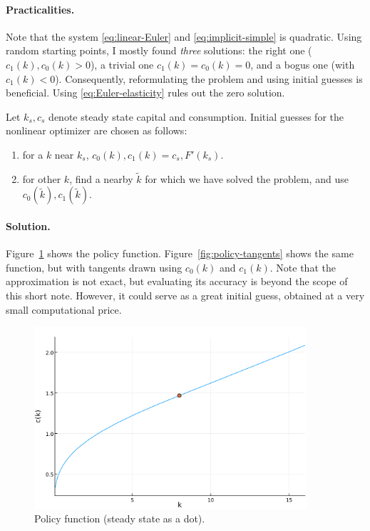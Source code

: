 \documentclass[a4paper,11pt]{article}
\newcommand{\tk}{\tilde{k}}
\begin{document}
\paragraph{Practicalities.}

Note that the system \eqref{eq:linear-Euler} and \eqref{eq:implicit-simple} is quadratic. Using random starting points, I mostly found  \emph{three} solutions: the right one ($c_1(k), c_0(k) > 0$), a trivial one $c_1(k) = c_0(k) = 0$, and a bogus one (with $c_1(k) < 0$). Consequently, reformulating the problem and using initial guesses is beneficial. Using \eqref{eq:Euler-elasticity} rules out the zero solution.

Let $k_s, c_s$ denote steady state capital and consumption. Initial guesses for the nonlinear optimizer are chosen as follows:
\begin{enumerate}
\item for a $k$ near $k_s$, $c_0(k), c_1(k) = c_s, F'(k_s)$.
\item for other $k$, find a nearby $\tk$ for which we have solved the problem, and use $c_0(\tk), c_1(\tk)$.
\end{enumerate}

\paragraph{Solution.}

Figure~\ref{fig:policy} shows the policy function. Figure~\ref{fig:policy-tangents} shows the same function, but with tangents drawn using $c_0(k)$ and $c_1(k)$. Note that the approximation is not exact, but evaluating its accuracy is beyond the scope of this short note. However, it could serve as a great initial guess, obtained at a very small computational price.

\begin{figure}
  \centering
  \includegraphics[width=0.9\textwidth]{../fig/ck.pdf}
  \caption{Policy function (steady state as a dot).}
  \label{fig:policy}
\end{figure}
\end{document}
